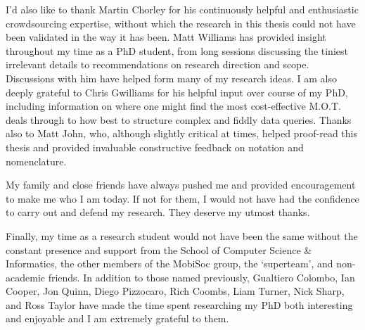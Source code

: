 I'd also like to thank Martin Chorley for his continuously helpful and enthusiastic crowdsourcing expertise, without which the research in this thesis could not have been validated in the way it has been. Matt Williams has provided insight throughout my time as a PhD student, from long sessions discussing the tiniest irrelevant details to recommendations on research direction and scope. Discussions with him have helped form many of my research ideas. I am also deeply grateful to Chris Gwilliams for his helpful input over course of my PhD, including information on where one might find the most cost-effective M.O.T. deals through to how best to structure complex and fiddly data queries. Thanks also to Matt John, who, although slightly critical at times, helped proof-read this thesis and provided invaluable constructive feedback on notation and nomenclature.

My family and close friends have always pushed me and provided encouragement to make me who I am today. If not for them, I would not have had the confidence to carry out and defend my research. They deserve my utmost thanks.

Finally, my time as a research student would not have been the same without the constant presence and support from the School of Computer Science \& Informatics, the other members of the MobiSoc group, the `superteam', and non-academic friends. In addition to those named previously, Gualtiero Colombo, Ian Cooper, Jon Quinn, Diego Pizzocaro, Rich Coombs, Liam Turner, Nick Sharp, and Ross Taylor have made the time spent researching my PhD both interesting and enjoyable and I am extremely grateful to them.






